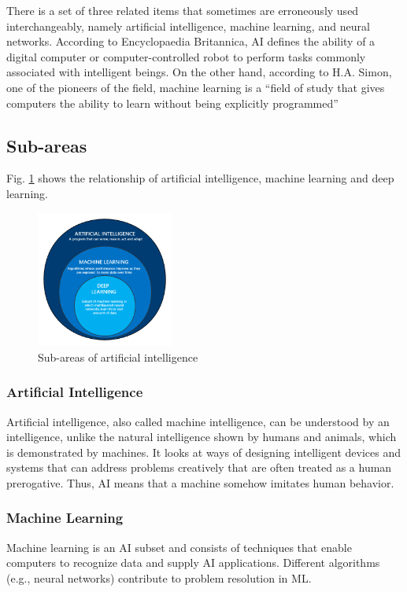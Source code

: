 There is a set of three related items that sometimes are erroneously used interchangeably, namely artificial intelligence, machine learning, and neural networks. According to Encyclopaedia Britannica, AI defines the ability of a digital computer or computer-controlled robot to perform tasks commonly associated with intelligent beings. On the other hand, according to H.A. Simon, one of the pioneers of the field, machine learning is a “field of study that gives computers the ability to learn without being explicitly programmed”

\subsection{Sub-areas}
Fig. \ref{fig:ai_taxonomy} shows the relationship of artificial intelligence, machine learning and deep learning.
\begin{figure}[htbp]
\centering
\includegraphics[width=0.4\textwidth]{./images/ai_taxonomy.png}
\caption{Sub-areas of artificial intelligence \parencite{Suman2020}}
\label{fig:ai_taxonomy}
\end{figure}

\subsubsection{Artificial Intelligence}
Artificial intelligence, also called machine intelligence, can be understood by an intelligence, unlike the natural intelligence shown by humans and animals, which is demonstrated by machines. It looks at ways of designing intelligent devices and systems that can address problems creatively that are often treated as a human prerogative. Thus, AI means that a machine somehow imitates human behavior.
\subsubsection{Machine Learning} 
Machine learning is an AI subset and consists of techniques that enable computers to recognize data and supply AI applications. Different algorithms (e.g., neural networks) contribute to problem resolution in ML.
